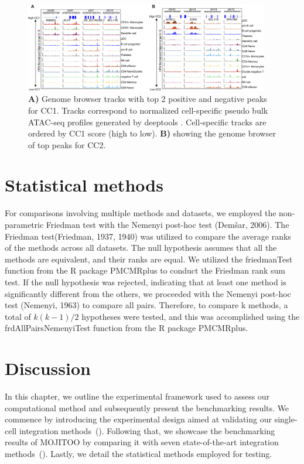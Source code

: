 \begin{figure}[!h]
	\centering
	\includegraphics[width=0.95\textwidth]{CC_Peaks/fig}
	\vspace{0.1cm}
	\caption[Genome browser tracks of top 2 positive and negative peaks for CC1 and CC2.]{ \textbf{A)} Genome browser tracks with top 2 positive and negative peaks for CC1. Tracks correspond to normalized cell-specific pseudo bulk ATAC-seq profiles generated by deeptools \citep{ramirez2016deeptools2}. Cell-specific tracks are ordered by CC1 score (high to low). \textbf{B)} showing the genome browser of top peaks for CC2.}
	\label{fig:CC_Peaks}
\end{figure}

\section{Statistical methods}
\label{MOJITOO:statistical}
For comparisons involving multiple methods and datasets, we employed the non-parametric Friedman test with the Nemenyi post-hoc test (Demšar, 2006). The Friedman test(Friedman, 1937, 1940) was utilized to compare the average ranks of the methods across all datasets. The null hypothesis assumes that all the methods are equivalent, and their ranks are equal. We utilized the friedmanTest function from the R package PMCMRplus to conduct the Friedman rank sum test. If the null hypothesis was rejected, indicating that at least one method is significantly different from the others, we proceeded with the Nemenyi post-hoc test (Nemenyi, 1963) to compare all pairs. Therefore, to compare k methods, a total of $k(k-1)/2$ hypotheses were tested, and this was accomplished using the frdAllPairsNemenyiTest function from the R package PMCMRplus.

\section{Discussion}
\label{MOJITOO:discussion}
In this chapter, we outline the experimental framework used to assess our computational method and subsequently present the benchmarking results. We commence by introducing the experimental design aimed at validating our single-cell integration methods~(). Following that, we showcase the benchmarking results of MOJITOO by comparing it with seven state-of-the-art integration methods~(). Lastly, we detail the statistical methods employed for testing.

